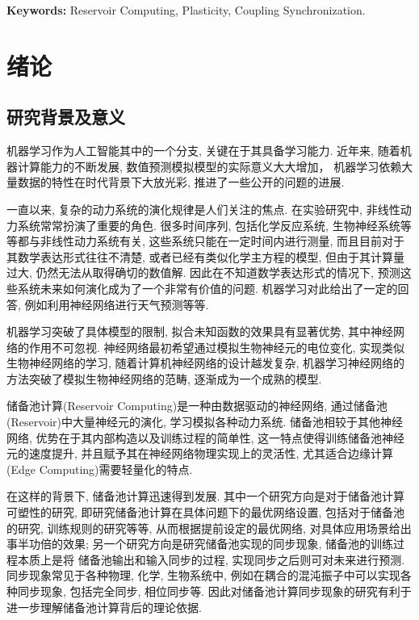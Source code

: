 \documentclass[notitlepage,cs4size,punct,oneside]{ctexrep}
\numberwithin{equation}{chapter}
\theoremstyle{mystyle}
\begin{document}
{\textbf{Keywords:}} Reservoir Computing, Plasticity, Coupling Synchronization. 


\chapter{绪论}

\section{研究背景及意义}

机器学习作为人工智能其中的一个分支, 关键在于其具备学习能力. 
近年来, 随着机器计算能力的不断发展, 数值预测模拟模型的实际意义大大增加，
机器学习依赖大量数据的特性在时代背景下大放光彩, 推进了一些公开的问题的进展. 

一直以来, 复杂的动力系统的演化规律是人们关注的焦点. 
在实验研究中, 非线性动力系统常常扮演了重要的角色. 
很多时间序列, 包括化学反应系统, 生物神经系统等等都与非线性动力系统有关,
这些系统只能在一定时间内进行测量, 而且目前对于其数学表达形式往往不清楚, 
或者已经有类似化学主方程的模型, 但由于其计算量过大, 仍然无法从取得确切的数值解. 
因此在不知道数学表达形式的情况下, 预测这些系统未来如何演化成为了一个非常有价值的问题.
机器学习对此给出了一定的回答, 例如利用神经网络进行天气预测\cite{VKMF}等等. 

机器学习突破了具体模型的限制, 拟合未知函数的效果具有显著优势, 
其中神经网络的作用不可忽视. 神经网络最初希望通过模拟生物神经元的电位变化, 
实现类似生物神经网络的学习, 随着计算机神经网络的设计越发复杂, 机器学习神经网络的
方法突破了模拟生物神经网络的范畴, 逐渐成为一个成熟的模型. 

储备池计算(Reservoir Computing)是一种由数据驱动的神经网络, 
通过储备池(Reservoir)中大量神经元的演化, 学习模拟各种动力系统. 
储备池相较于其他神经网络, 优势在于其内部构造以及训练过程的简单性, 
这一特点使得训练储备池神经元的速度提升, 并且赋予其在神经网络物理实现上的灵活性\cite{YTJK}, 
尤其适合边缘计算(Edge Computing)需要轻量化的特点\cite{WSJC}.

在这样的背景下, 储备池计算迅速得到发展. 
其中一个研究方向是对于储备池计算可塑性的研究, 
即研究储备池计算在具体问题下的最优网络设置, 包括对于储备池的研究, 训练规则的研究等等, 
从而根据提前设定的最优网络, 对具体应用场景给出事半功倍的效果; 
另一个研究方向是研究储备池实现的同步现象, 储备池的训练过程本质上是将
储备池输出和输入同步的过程\cite{QZHM}, 实现同步之后则可对未来进行预测. 
同步现象常见于各种物理, 化学, 生物系统中, 
例如在耦合的混沌振子中可以实现各种同步现象, 包括完全同步\cite{LPTC}, 相位同步\cite{MRAP}等. 
因此对储备池计算同步现象的研究有利于进一步理解储备池计算背后的理论依据. 
\end{document}
